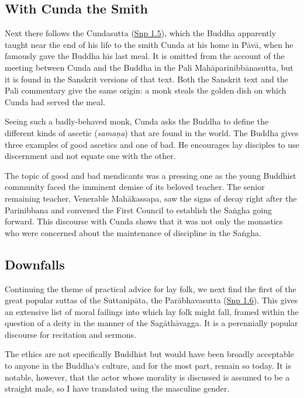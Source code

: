 \documentclass[12pt,openany]{book}%
\begin{document}
\subsection*{With Cunda the Smith}

Next there follows the Cundasutta (\href{https://suttacentral.net/snp1.5/en/sujato}{Snp 1.5}), which the Buddha apparently taught near the end of his life to the smith Cunda at his home in \textsanskrit{Pāvā}, when he famously gave the Buddha his last meal. It is omitted from the account of the meeting between Cunda and the Buddha in the Pali \textsanskrit{Mahāparinibbānasutta}, but it is found in the Sanskrit versions of that text. Both the Sanskrit text and the Pali commentary give the same origin: a monk steals the golden dish on which Cunda had served the meal.

Seeing such a badly-behaved monk, Cunda asks the Buddha to define the different kinds of ascetic (\textit{\textsanskrit{samaṇa}}) that are found in the world. The Buddha gives three examples of good ascetics and one of bad. He encourages lay disciples to use discernment and not equate one with the other.

The topic of good and bad mendicants was a pressing one as the young Buddhist community faced the imminent demise of its beloved teacher. The senior remaining teacher, Venerable \textsanskrit{Mahākassapa}, saw the signs of decay right after the Parinibbana and convened the First Council to establish the \textsanskrit{Saṅgha} going forward. This discourse with Cunda shows that it was not only the monastics who were concerned about the maintenance of discipline in the \textsanskrit{Saṅgha}.

\subsection*{Downfalls}

Continuing the theme of practical advice for lay folk, we next find the first of the great popular suttas of the \textsanskrit{Suttanipāta}, the \textsanskrit{Parābhavasutta} (\href{https://suttacentral.net/snp1.6/en/sujato}{Snp 1.6}). This gives an extensive list of moral failings into which lay folk might fall, framed within the question of a deity in the manner of the \textsanskrit{Sagāthāvagga}. It is a perennially popular discourse for recitation and sermons.

The ethics are not specifically Buddhist but would have been broadly acceptable to anyone in the Buddha‘s culture, and for the most part, remain so today. It is notable, however, that the actor whose morality is discussed is assumed to be a straight male, so I have translated using the masculine gender.
\end{document}
